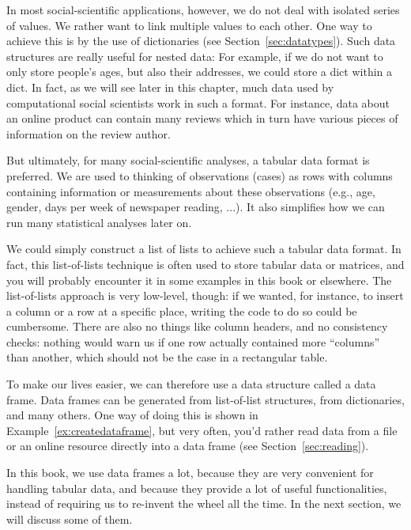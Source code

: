 In most social-scientific applications, however, we do not deal with isolated series of values. We rather want to link multiple values to each other. One way to achieve this is by the use of dictionaries (see Section~\ref{sec:datatypes}).
Such data structures are really useful for nested data:
For example, if we do not want to only store people's ages, but also their addresses,
we could store a dict within a dict.
In fact, as we will see later in this chapter, much data used by computational social scientists work in such a format.
For instance, data about an online product can contain many reviews which in turn have various pieces of information on the review author.

But ultimately, for many social-scientific analyses, a tabular data format is preferred.
We are used to thinking of observations (cases) as rows with columns containing information or measurements about these observations (e.g., age, gender, days per week of newspaper reading, ...). It also simplifies how we can run many statistical analyses later on.

We could simply construct a list of lists to achieve such a tabular data format.
In fact, this list-of-lists technique is often used to store tabular data or matrices, and you will probably encounter it in some examples in this book or elsewhere. The list-of-lists approach is very low-level, though: if we wanted, for instance, to insert a column or a row at a specific place, writing the code to do so could be cumbersome. There are also no things like column headers, and no consistency checks: nothing would warn us if one row actually contained more ``columns'' than another, which should not be the case in a rectangular table.

To make our lives easier, we can therefore use a data structure called a data frame.
Data frames can be generated from list-of-list structures, from dictionaries, and many others.
One way of doing this is shown in Example~\ref{ex:createdataframe}, but very often, you'd rather read data from a file or an online resource directly into a data frame (see Section~\ref{sec:reading}).


In this book, we use data frames a lot, because they are very convenient for handling tabular data, and because they provide a lot of useful functionalities, instead of requiring us to re-invent the wheel all the time. In the next section, we will discuss some of them.

